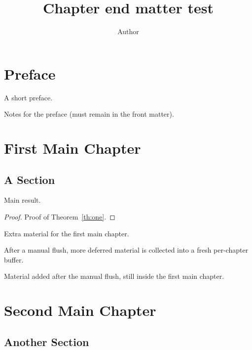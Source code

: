 \documentclass{book}
\title{Chapter end matter test}
\author{Author}
\date{}
\theoremstyle{plain}
\begin{document}
\maketitle

\frontmatter

\chapter{Preface}

A short preface.

\begin{toappendix}
  Notes for the preface (must remain in the front matter).
\end{toappendix}

\mainmatter

\chapter{First Main Chapter}

\section{A Section}

\begin{theoremrep}
  \label{th:one}%
  Main result.
\end{theoremrep}

\begin{proof}
  Proof of Theorem~\ref{th:one}.
\end{proof}

\begin{toappendix}
  Extra material for the first main chapter.
\end{toappendix}

\flushchapterappendix

After a manual flush, more deferred material is collected into a
fresh per-chapter buffer.

\begin{toappendix}
  Material added after the manual flush, still inside the first
  main chapter.
\end{toappendix}

\chapter{Second Main Chapter}

\section{Another Section}
\end{document}
